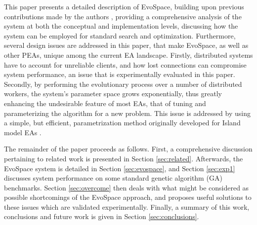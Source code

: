 This paper presents a detailed description of EvoSpace, building upon previous contributions made by the authors \cite{Evospace,FreeLunch},
providing a comprehensive analysis of the system at both the
conceptual and implementation levels, %
 discussing how the system can be
employed for standard search and optimization.
Furthermore, several design issues are addressed in this paper, that
make EvoSpace, as well as other PEAs,  %
unique among the current EA landscape.
Firstly, distributed systems have to account for unreliable clients, and how lost connections can compromise system performance,
an issue that is experimentally evaluated in this paper.
Secondly, by performing the evolutionary process over a number of distributed workers, the system's parameter space grows exponentially,
thus greatly enhancing the undesirable feature of most EAs, that of tuning and parameterizing the algorithm for a new problem.
This issue is addressed by using a simple, but efficient,
parametrization method originally developed for Island model EAs
\cite{fuku2}.

The remainder of the paper proceeds as follows.
First, a comprehensive discussion pertaining to related work is presented in Section \ref{sec:related}.
Afterwards, the EvoSpace system is detailed in Section \ref{sec:evospace}, and Section 
\ref{sec:exp1} discusses system performance on some standard genetic algorithm (GA) benchmarks.
Section \ref{sec:overcome} then deals with what might be considered as possible shortcomings of the EvoSpace approach,
and proposes useful solutions to these issues which are validated experimentally.
Finally, a summary of this work, conclusions and future work is given in Section \ref{sec:conclusions}.
 


